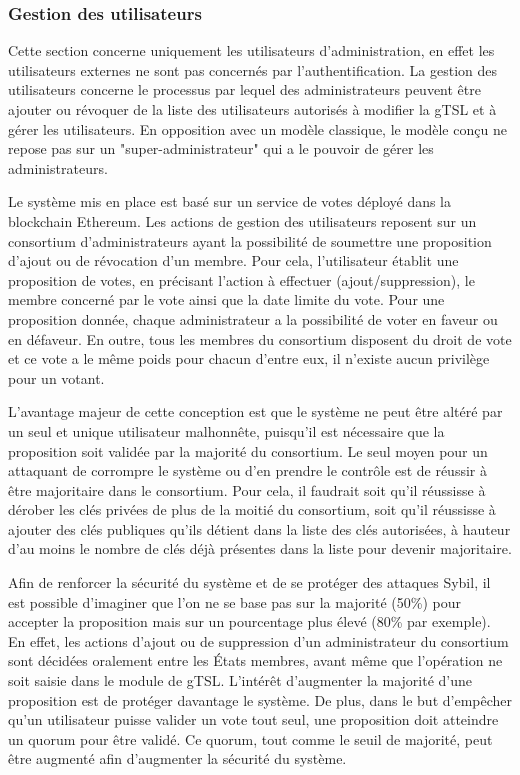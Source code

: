 \documentclass{tnreport}
\begin{document}
\subsubsection{Gestion des utilisateurs}

Cette section concerne uniquement les utilisateurs d'administration, en effet les utilisateurs externes ne sont pas concernés par l'authentification.
La gestion des utilisateurs concerne le processus par lequel des administrateurs peuvent être ajouter ou révoquer de la liste des utilisateurs autorisés à modifier la gTSL et à gérer les utilisateurs. 
En opposition avec un modèle classique, le modèle conçu ne repose pas sur un "super-administrateur" qui a le pouvoir de gérer les administrateurs. 

Le système mis en place est basé sur un service de votes déployé dans la blockchain Ethereum. Les actions de gestion des utilisateurs reposent sur un consortium d'administrateurs ayant la possibilité de soumettre une proposition d'ajout ou de révocation d'un membre. Pour cela, l'utilisateur établit une proposition de votes, en précisant l'action à effectuer (ajout/suppression), le membre concerné par le vote ainsi que la date limite du vote. Pour une proposition donnée, chaque administrateur a la possibilité de voter en faveur ou en défaveur. En outre, tous les membres du consortium disposent du droit de vote et ce vote a le même poids pour chacun d'entre eux, il n'existe aucun privilège pour un votant.

L'avantage majeur de cette conception est que le système ne peut être altéré par un seul et unique utilisateur malhonnête, puisqu'il est nécessaire que la proposition soit validée par la majorité du consortium. Le seul moyen pour un attaquant de corrompre le système ou d'en prendre le contrôle est de réussir à être majoritaire dans le consortium. Pour cela, il faudrait soit qu'il réussisse à dérober les clés privées de plus de la moitié du consortium, soit qu'il réussisse à ajouter des clés publiques qu'ils détient dans la liste des clés autorisées, à hauteur d'au moins le nombre de clés déjà présentes dans la liste pour devenir majoritaire. 

Afin de renforcer la sécurité du système et de se protéger des attaques Sybil, il est possible d'imaginer que l'on ne se base pas sur la majorité (50\%) pour accepter la proposition mais sur un pourcentage plus élevé (80\% par exemple). En effet, les actions d'ajout ou de suppression d'un administrateur du consortium sont décidées oralement entre les États membres, avant même que l'opération ne soit saisie dans le module de gTSL. L'intérêt d'augmenter la majorité d'une proposition est de protéger davantage le système. De plus, dans le but d'empêcher qu'un utilisateur puisse valider un vote tout seul, une proposition doit atteindre un quorum pour être validé. Ce quorum, tout comme le seuil de majorité, peut être augmenté afin d'augmenter la sécurité du système.
\end{document}
